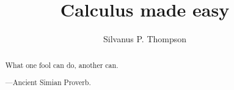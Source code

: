 \documentclass{xourse}
\title{Calculus made easy}
\author{Silvanus P. Thompson}
\begin{document}
\begin{abstract}
  What one fool can do, another can.

  \hfill ---Ancient Simian Proverb.
\end{abstract}
\maketitle

\setcounter{tocdepth}{2}

\chapterstyle
{}
\end{document}
